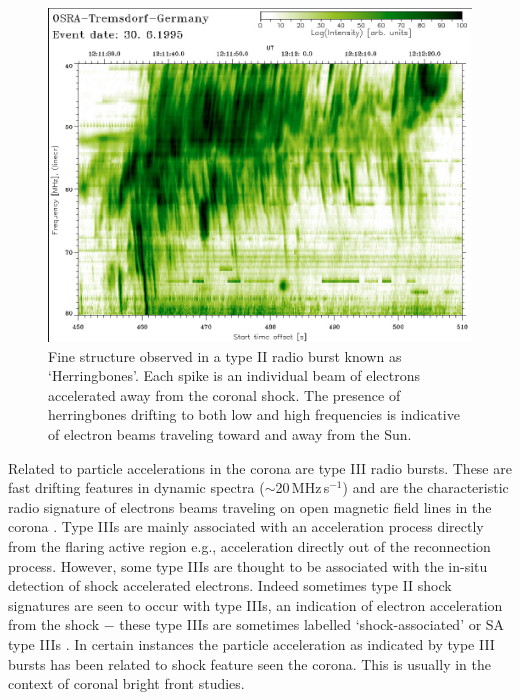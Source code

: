 \begin{figure}[!t]
\begin{center}
\includegraphics[scale=1.4]{images/miteva_herbones.pdf}
\caption[Herringbone radio bursts]{Fine structure observed in a type II radio burst known as \textquoteleft Herringbones'. Each spike is an individual beam of electrons accelerated away from the coronal shock. The presence of herringbones drifting to both low and high frequencies is indicative of electron beams traveling toward and away from the Sun.}
\label{fig:herringbones}
\end{center}
\end{figure}

Related to particle accelerations in the corona are type III radio bursts. These are fast drifting features in dynamic spectra ($\sim$20\,MHz\,s$^{-1}$) and are the characteristic radio signature of electrons beams traveling on open magnetic field lines in the corona \citep{pick2008}. Type IIIs are mainly associated with an acceleration process directly from the flaring active region e.g., acceleration directly out of the reconnection process. However, some type IIIs are thought to be associated with the in-situ detection of shock accelerated electrons. Indeed sometimes type II shock signatures are seen to occur with type IIIs, an indication of electron acceleration from the shock $-$ these type IIIs are sometimes labelled \textquoteleft shock-associated' or SA type IIIs \citep{bougeret1998}. In certain instances the particle acceleration as indicated by type III bursts has been related to shock feature seen the corona. This is usually in the context of coronal bright front studies.

